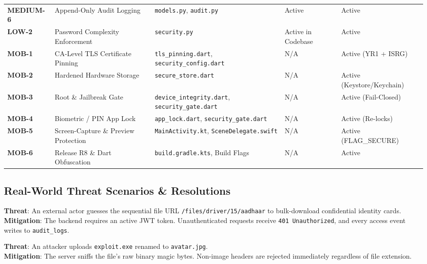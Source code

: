 \documentclass[11pt,a4paper]{article}
\begin{document}
\begin{longtable}{>{\bfseries\small}L{1.8cm} L{3.0cm} L{3.4cm} L{2.2cm} L{2.2cm}}
MEDIUM-6 & Append-Only Audit Logging & \texttt{models.py}, \texttt{audit.py} & Active & Active \\
LOW-2 & Password Complexity Enforcement & \texttt{security.py} & Active in Codebase & Active \\
MOB-1 & CA-Level TLS Certificate Pinning & \texttt{tls\_pinning.dart}, \texttt{security\_config.dart} & N/A & Active (YR1 + ISRG) \\
MOB-2 & Hardened Hardware Storage & \texttt{secure\_store.dart} & N/A & Active (Keystore/Keychain) \\
MOB-3 & Root \& Jailbreak Gate & \texttt{device\_integrity.dart}, \texttt{security\_gate.dart} & N/A & Active (Fail-Closed) \\
MOB-4 & Biometric / PIN App Lock & \texttt{app\_lock.dart}, \texttt{security\_gate.dart} & N/A & Active (Re-locks) \\
MOB-5 & Screen-Capture \& Preview Protection & \texttt{MainActivity.kt}, \texttt{SceneDelegate.swift} & N/A & Active (FLAG\_SECURE) \\
MOB-6 & Release R8 \& Dart Obfuscation & \texttt{build.gradle.kts}, Build Flags & N/A & Active \\
\end{longtable}

\subsection{Real-World Threat Scenarios \& Resolutions}

\begin{infobox}[title={Scenario A: Unauthenticated Document Scraping (CRITICAL-1)}]
\textbf{Threat}: An external actor guesses the sequential file URL \texttt{/files/driver/15/aadhaar} to bulk-download confidential identity cards.\\[3pt]
\textbf{Mitigation}: The backend requires an active JWT token. Unauthenticated requests receive \texttt{401 Unauthorized}, and every access event writes to \texttt{audit\_logs}.
\end{infobox}

\begin{infobox}[title={Scenario B: Executable Disguised as Profile Photo (HIGH-1)}]
\textbf{Threat}: An attacker uploads \texttt{exploit.exe} renamed to \texttt{avatar.jpg}.\\[3pt]
\textbf{Mitigation}: The server sniffs the file's raw binary magic bytes. Non-image headers are rejected immediately regardless of file extension.
\end{infobox}
\end{document}
